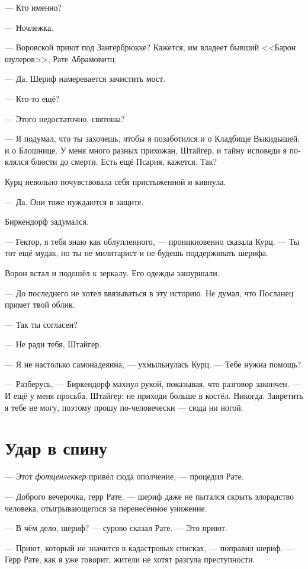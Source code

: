 \documentclass[a4paper,12pt,fleqn]{book}\usepackage{polyglossia}\setdefaultlanguage[babelshorthands=true]{russian}\setotherlanguage{english}\defaultfontfeatures{Ligatures=TeX,Mapping=tex-text}\usepackage{xcolor}\newcommand{\ml}[3]{#2}
\begin{document}
--- Кто именно?

--- Ночлежка.

--- Воровской приют под Зангербрюкке?
Кажется, им владеет бывший <<Барон шулеров>>, Рате Абрамовитц.

--- Да.
Шериф намеревается зачистить мост.

--- Кто-то ещё?

--- Этого недостаточно, святоша?

--- Я подумал, что ты захочешь, чтобы я позаботился и о Кладбище Выкидышей, и о Блошнице.
У меня много разных прихожан, Штайгер, и тайну исповеди я поклялся блюсти до смерти.
Есть ещё Псарня, кажется.
Так?

Курц невольно почувствовала себя пристыженной и кивнула.

--- Да.
Они тоже нуждаются в защите.

Биркендорф задумался.

--- Гектор, я тебя знаю как облупленного, --- проникновенно сказала Курц.
--- Ты тот ещё мудак, но ты не милитарист и не будешь поддерживать шерифа.

Ворон встал и подошёл к зеркалу.
Его одежды зашуршали.

--- До последнего не хотел ввязываться в эту историю.
Не думал, что Посланец примет твой облик.

--- Так ты согласен?

--- Не ради тебя, Штайгер.

--- Я не настолько самонадеянна, --- ухмыльнулась Курц.
--- Тебе нужна помощь?

--- Разберусь, --- Биркендорф махнул рукой, показывая, что разговор закончен.
--- И ещё у меня просьба, Штайгер: не приходи больше в костёл.
Никогда.
Запретить я тебе не могу, поэтому прошу по-человечески --- сюда ни ногой.

\section{Удар в спину}

--- Этот \textit{фотценлеккер} привёл сюда ополчение, --- процедил Рате.

--- Доброго вечерочка, герр Рате, --- шериф даже не пытался скрыть злорадство человека, отыгрывающегося за перенесённое унижение.

--- В чём дело, шериф? --- сурово сказал Рате.
--- Это приют.

--- Приют, который не значится в кадастровых списках, --- поправил шериф.
--- Герр Рате, как я уже говорит, жители не хотят разгула преступности.
\end{document}
